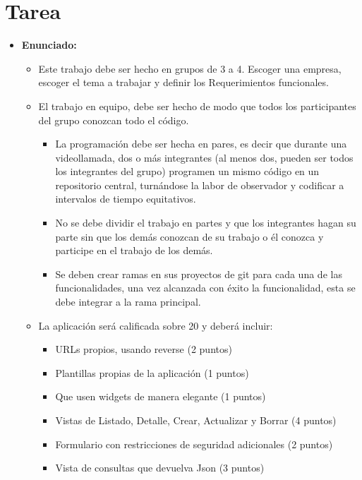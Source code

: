 \documentclass{article}
\begin{document}
\tableofcontents
\pagebreak


\section{Tarea}
\begin{itemize}
	\item \textbf{Enunciado:}
	      \begin{itemize}
		      \item Este trabajo debe ser hecho en grupos de 3 a 4. Escoger una empresa, escoger el tema a trabajar y definir los Requerimientos funcionales.
		      \item El trabajo en equipo, debe ser hecho de modo que todos los participantes del grupo conozcan todo el código.
		            \begin{itemize}
			            \item La programación debe ser hecha en pares, es decir que durante una videollamada, dos o más integrantes (al menos dos, pueden ser todos los integrantes del grupo) programen un mismo código en un repositorio central, turnándose la labor de observador y codificar a intervalos de tiempo equitativos.
			            \item No se debe dividir el trabajo en partes y que los integrantes hagan su parte sin que los demás conozcan de su trabajo o él conozca y participe en el trabajo de los demás.
			            \item Se deben crear ramas en sus proyectos de git para cada una de las funcionalidades, una vez alcanzada con éxito la funcionalidad, esta se debe integrar a la rama principal.
		            \end{itemize}
		      \item La aplicación será calificada sobre 20 y deberá incluir:
		            \begin{itemize}
			            \item URLs propios, usando reverse (2 puntos)
			            \item Plantillas propias de la aplicación (1 puntos)
			            \item Que usen widgets de manera elegante (1 puntos)
			            \item Vistas de Listado, Detalle, Crear, Actualizar y Borrar (4 puntos)
			            \item Formulario con restricciones de seguridad adicionales (2 puntos)
			            \item Vista de consultas que devuelva Json (3 puntos)

\end{itemize}
\end{itemize}
\end{itemize}
\end{document}
